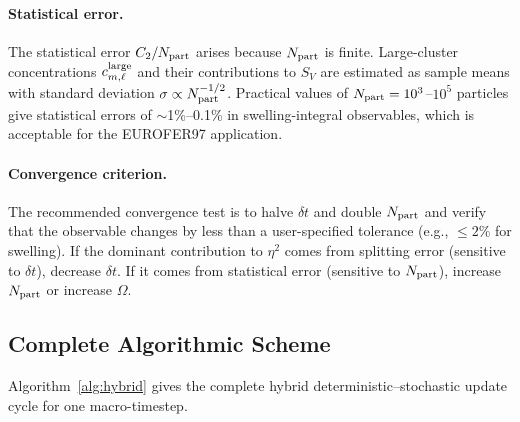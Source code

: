 \paragraph{Statistical error.}
The statistical error $C_2/N_{\rm part}$ arises because $N_{\rm part}$
is finite.  Large-cluster concentrations $c_{m,\ell}^{\rm large}$ and
their contributions to $S_V$ are estimated as sample means with
standard deviation $\sigma \propto N_{\rm part}^{-1/2}$.  Practical
values of $N_{\rm part} = 10^3$--$10^5$ particles give statistical
errors of $\sim$1\%--0.1\% in swelling-integral observables, which
is acceptable for the EUROFER97 application.

\paragraph{Convergence criterion.}
The recommended convergence test is to halve $\delta t$ and double
$N_{\rm part}$ and verify that the observable changes by less than a
user-specified tolerance (e.g., $\leq 2\%$ for swelling).  If the
dominant contribution to $\eta^2$ comes from splitting error
(sensitive to $\delta t$), decrease $\delta t$.  If it comes from
statistical error (sensitive to $N_{\rm part}$), increase
$N_{\rm part}$ or increase $\Omega$.

\subsection{Complete Algorithmic Scheme}
\label{sec:hybrid_algorithm}

Algorithm~\ref{alg:hybrid} gives the complete hybrid
deterministic--stochastic update cycle for one macro-timestep.

